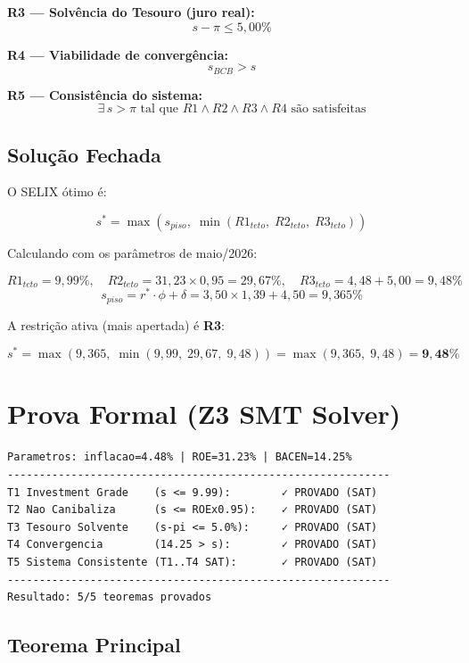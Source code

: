 \documentclass[12pt,a4paper]{article}
\begin{document}
\textbf{R3 — Solvência do Tesouro (juro real):}
\[
s - \pi \leq 5,00\%
\]

\textbf{R4 — Viabilidade de convergência:}
\[
s_{BCB} > s
\]

\textbf{R5 — Consistência do sistema:}
\[
\exists\, s > \pi \text{ tal que } R1 \wedge R2 \wedge R3 \wedge R4 \text{ são satisfeitas}
\]

\subsection{Solução Fechada}

O SELIX ótimo é:

\[
\boxed{s^* = \max\!\left(s_{piso},\; \min(R1_{teto},\; R2_{teto},\; R3_{teto})\right)}
\]

Calculando com os parâmetros de maio/2026:

\[
R1_{teto} = 9,99\%,\quad 
R2_{teto} = 31,23 \times 0,95 = 29,67\%,\quad 
R3_{teto} = 4,48 + 5,00 = 9,48\%
\]
\[
s_{piso} = r^* \cdot \phi + \delta = 3,50 \times 1,39 + 4,50 = 9,365\%
\]

A restrição ativa (mais apertada) é \textbf{R3}:

\[
s^* = \max(9,365,\; \min(9,99,\; 29,67,\; 9,48)) = \max(9,365,\; 9,48) = \mathbf{9,48\%}
\]

\section{Prova Formal (Z3 SMT Solver)}

\begin{tcolorbox}[colback=gray!5, colframe=gray!70, title=SELIX v3.2 — PROVA FORMAL COM Z3]
\begin{verbatim}
Parametros: inflacao=4.48% | ROE=31.23% | BACEN=14.25%
------------------------------------------------------------
T1 Investment Grade    (s <= 9.99):        ✓ PROVADO (SAT)
T2 Nao Canibaliza      (s <= ROEx0.95):    ✓ PROVADO (SAT)
T3 Tesouro Solvente    (s-pi <= 5.0%):     ✓ PROVADO (SAT)
T4 Convergencia        (14.25 > s):        ✓ PROVADO (SAT)
T5 Sistema Consistente (T1..T4 SAT):       ✓ PROVADO (SAT)
------------------------------------------------------------
Resultado: 5/5 teoremas provados
\end{verbatim}
\end{tcolorbox}

\subsection{Teorema Principal}
\end{document}
